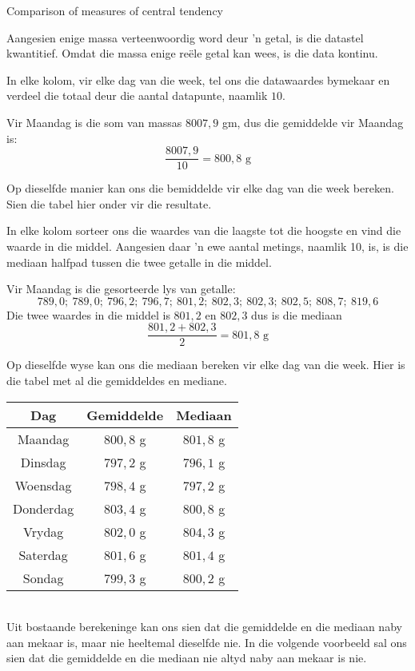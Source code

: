\begin{wex}{Comparison of measures of central tendency}
{  Aangesien enige massa verteenwoordig word deur ’n getal, is die datastel kwantitief. Omdat die massa enige reële getal kan wees, is die data kontinu.


 In elke kolom, vir elke dag van die week, tel ons die datawaardes bymekaar en verdeel die totaal deur die aantal datapunte, naamlik $10$.

  Vir Maandag is die som van massas $8007,9$ gm, dus die gemiddelde vir Maandag is:
  \begin{equation*}
    \frac{8007,9}{10} = 800,8\mbox{ g}
  \end{equation*}

  Op dieselfde manier kan ons die bemiddelde vir elke dag van die week bereken. Sien die tabel hier onder vir die resultate.


  In elke kolom sorteer ons die waardes van die laagste tot die hoogste en vind die waarde in die middel. Aangesien daar ’n ewe aantal metings, naamlik 10, is, is die mediaan halfpad tussen die twee getalle in die middel.

  Vir Maandag is die gesorteerde lys van getalle:
  \begin{equation*}
    789,0;\ 789,0;\ 796,2;\ 796,7;\ 801,2;\ 802,3;\ 802,3;\ 802,5;\ 808,7;\ 819,6
  \end{equation*}
  Die twee waardes in die middel is $801,2$ en $802,3$ dus is die mediaan
  \begin{equation*}
    \frac{801,2 + 802,3}{2} = 801,8\mbox{ g}
  \end{equation*}

  Op dieselfde wyse kan ons die mediaan bereken vir elke dag van die week. Hier is die tabel met al die gemiddeldes en mediane. 
\\
  \begin{center}
    \begin{tabular}{|c|c|c|} \hline
      \textbf{Dag} & \textbf{Gemiddelde} &\textbf{Mediaan} \\  \hline
      Maandag & $800,8$ g & $801,8$ g \\ \hline
      Dinsdag & $797,2$ g & $796,1$ g \\ \hline
      Woensdag & $798,4$ g & $797,2$ g \\ \hline
      Donderdag & $803,4$ g & $800,8$ g \\ \hline
      Vrydag & $802,0$ g & $804,3$ g \\ \hline
      Saterdag & $801,6$ g & $801,4$ g \\ \hline
      Sondag & $799,3$ g & $800,2$ g \\ \hline
    \end{tabular}
  \end{center}
\vspace{8pt}\\
  Uit bostaande berekeninge kan ons sien dat die gemiddelde en die mediaan naby aan mekaar is, maar nie heeltemal dieselfde nie. In die volgende voorbeeld sal ons sien dat die gemiddelde en die mediaan nie altyd naby aan mekaar is nie.

}
\end{wex}
